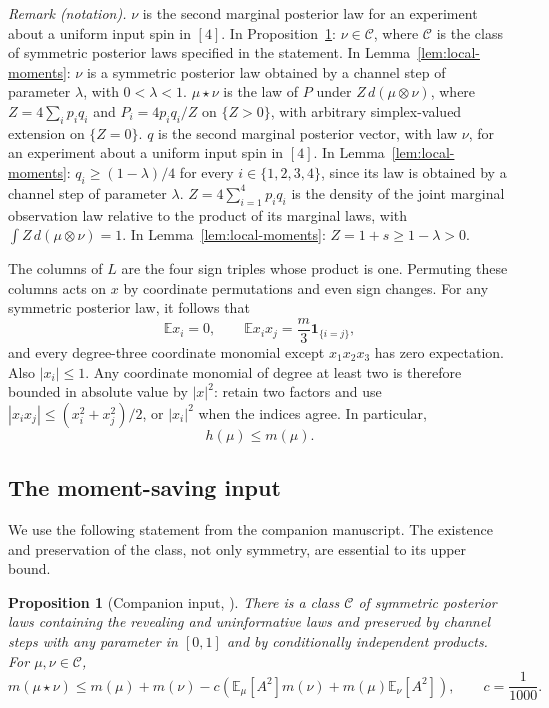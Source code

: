 \documentclass[11pt]{article}
\newtheorem{proposition}[theorem]{Proposition}
\numberwithin{equation}{section}
\newcommand{\E}{\mathbb E}
\newcommand{\calC}{\mathcal C}
\begin{document}
\noindent\textit{Remark (notation).} $\nu$ is the second marginal posterior law for an experiment about a uniform input spin in $[4]$. In Proposition~\ref{prop:companion}: $\nu\in\calC$, where $\calC$ is the class of symmetric posterior laws specified in the statement. In Lemma~\ref{lem:local-moments}: $\nu$ is a symmetric posterior law obtained by a channel step of parameter $\lambda$, with $0<\lambda<1$. $\mu\star\nu$ is the law of $P$ under $Z\,d(\mu\otimes\nu)$, where $Z=4\sum_i p_iq_i$ and $P_i=4p_iq_i/Z$ on $\{Z>0\}$, with arbitrary simplex-valued extension on $\{Z=0\}$. $q$ is the second marginal posterior vector, with law $\nu$, for an experiment about a uniform input spin in $[4]$. In Lemma~\ref{lem:local-moments}: $q_i\geq(1-\lambda)/4$ for every $i\in\{1,2,3,4\}$, since its law is obtained by a channel step of parameter $\lambda$. $Z=4\sum_{i=1}^4p_iq_i$ is the density of the joint marginal observation law relative to the product of its marginal laws, with $\int Z\,d(\mu\otimes\nu)=1$. In Lemma~\ref{lem:local-moments}: $Z=1+s\geq1-\lambda>0$.


The columns of $L$ are the four sign triples whose product is
one. Permuting these columns acts on $x$ by coordinate permutations
and even sign changes. For any symmetric posterior law, it follows
that
\begin{equation}\label{eq:symmetric-moments}
 \E x_i=0,\qquad
 \E x_ix_j=\frac{m}{3}\mathbf1_{\{i=j\}},
\end{equation}
and every degree-three coordinate monomial except $x_1x_2x_3$
has zero expectation. Also $|x_i|\leq1$. Any coordinate monomial
of degree at least two is therefore bounded in absolute value
by $|x|^2$: retain two factors and use
$|x_ix_j|\leq(x_i^2+x_j^2)/2$, or $|x_i|^2$ when the indices
agree. In particular,
\begin{equation}\label{eq:h-bound}
 h(\mu)\leq m(\mu).
\end{equation}

\subsection{The moment-saving input}

We use the following statement from the companion manuscript.
The existence and preservation of the class, not only symmetry,
are essential to its upper bound.

\begin{proposition}[Companion input, {\cite[Proposition~3.2 and Equations~(3.8)--(3.9)]{OpenAI26Potts}}]
\label{prop:companion}
There is a class $\calC$ of symmetric posterior laws containing
the revealing and uninformative laws and preserved by channel
steps with any parameter in $[0,1]$ and by conditionally independent
products. For $\mu,\nu\in\calC$,
\begin{equation}\label{eq:moment-saving}
 m(\mu\star\nu)\leq m(\mu)+m(\nu)
 -c\left(\E_\mu[A^2]m(\nu)+m(\mu)\E_\nu[A^2]\right),
 \qquad c=\frac1{1000}.
\end{equation}
\end{proposition}
\end{document}

